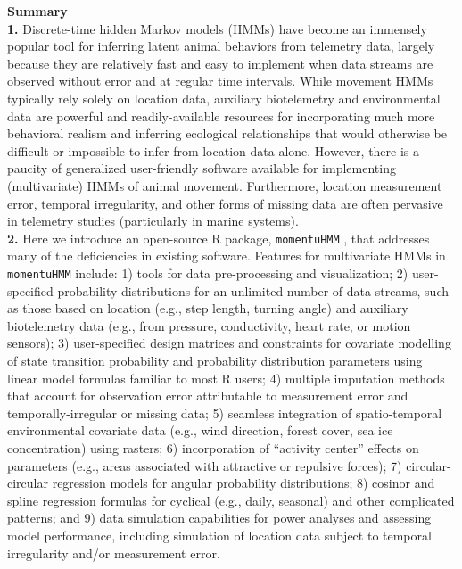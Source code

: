 \documentclass[12pt]{article}\usepackage[]{graphicx}\usepackage[]{color}
\begin{document}
\noindent \textbf{Summary}\\
\textbf{1.} Discrete-time hidden Markov models (HMMs) have become an immensely popular tool for inferring latent animal behaviors from telemetry data, largely because they are relatively fast and easy to implement when data streams are observed without error and at regular time intervals. While movement HMMs typically rely solely on location data, auxiliary biotelemetry and environmental data are powerful and readily-available resources for incorporating much more behavioral realism and inferring ecological relationships that would otherwise be difficult or impossible to infer from location data alone.  However, there is a paucity of generalized user-friendly software available for implementing (multivariate) HMMs of animal movement. Furthermore, location measurement error, temporal irregularity, and other forms of missing data are often pervasive in telemetry studies (particularly in marine systems).\\ %
\textbf{2.} Here we introduce an open-source R package, \verb|momentuHMM| %
, that addresses many of the deficiencies in existing software.  Features for multivariate HMMs in \verb|momentuHMM| include: 1) tools for data pre-processing and visualization; 2) user-specified probability distributions for an unlimited number of data streams, such as those based on location (e.g., step length, turning angle) and auxiliary biotelemetry data (e.g., from pressure, conductivity, heart rate, or motion sensors); 3) user-specified design matrices and constraints for covariate modelling of state transition probability and probability distribution parameters using linear model formulas familiar to most R users; 4) multiple imputation methods that account for observation error attributable to measurement error and temporally-irregular or missing data; 5) seamless integration of spatio-temporal environmental covariate data (e.g., wind direction, forest cover, sea ice concentration) using rasters; 6) incorporation of ``activity center'' effects on parameters (e.g., areas associated with attractive or repulsive forces); 7) circular-circular regression models for angular probability distributions; 8) cosinor and spline regression formulas for cyclical (e.g., daily, seasonal) and other complicated patterns; and 9) data simulation capabilities for power analyses and assessing model performance, including simulation of location data subject to temporal irregularity and/or measurement error.\\ 
\end{document}

